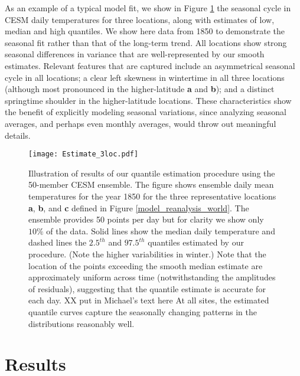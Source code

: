 \documentclass{ametsoc}
\newcommand\smallfigwidth{\columnwidth}
\begin{document}
 As an example of a typical model fit, we show in Figure \ref{Estimate} the seasonal cycle in CESM daily temperatures for three locations, along with estimates of low, median and high quantiles. We show here data from 1850 to demonstrate the seasonal fit rather than that of the long-term trend. All locations show strong seasonal differences in variance that are well-represented by our smooth estimates. Relevant features that are captured include an asymmetrical seasonal cycle in all locations; a clear left skewness in wintertime in all three locations (although most pronounced in the higher-latitude \textbf{a} and \textbf{b}); and a distinct springtime shoulder in the higher-latitude locations. %
These characteristics show the benefit of explicitly modeling seasonal variations, since analyzing seasonal averages, and perhaps even monthly averages, would throw out meaningful details.

\begin{figure}[t]       %
\centerline{\texttt{[image: Estimate\_3loc.pdf]}}
\caption{\small{Illustration of results of our quantile estimation procedure using the 50-member CESM ensemble. The figure shows ensemble daily mean temperatures for the year 1850 for the three representative locations \textbf{a}, \textbf{b}, and \textbf{c} defined in Figure \ref{model_reanalysis_world}. The ensemble provides 50 points per day but for clarity we show only $10\%$ of the data. Solid lines show the median daily temperature and dashed lines the $2.5^{th}$ and $97.5^{th}$ quantiles estimated by our procedure. %
(Note the higher variabilities in winter.)  Note that the location of the points exceeding the smooth median estimate are approximately uniform across time (notwithstanding the amplitudes of residuals), suggesting that the quantile estimate is accurate for each day. XX put in Michael's text here
At all sites, the estimated quantile curves capture the seasonally changing patterns in the distributions reasonably well.
}} 

\label{Estimate}          %
\end{figure}

\section{Results}
\label{sec:results}
\end{document}

